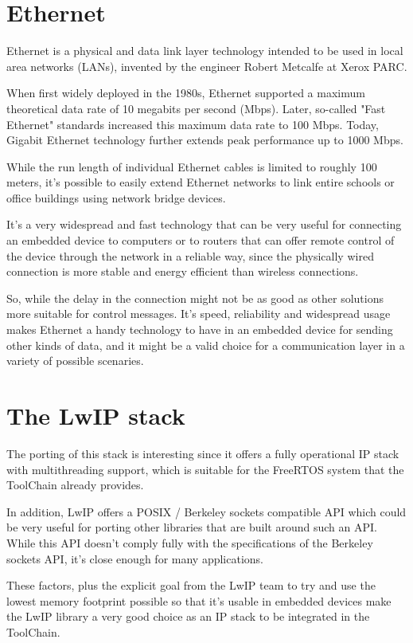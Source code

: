 \section {Ethernet}

Ethernet is a physical and data link layer technology intended to be used in local area networks (LANs), invented by the engineer Robert Metcalfe at Xerox PARC.

When first widely deployed in the 1980s, Ethernet supported a maximum theoretical data rate of 10 megabits per second (Mbps). Later, so-called "Fast Ethernet" standards increased this maximum data rate to 100 Mbps. Today, Gigabit Ethernet technology further extends peak performance up to 1000 Mbps.

While the run length of individual Ethernet cables is limited to roughly 100 meters, it's possible to easily extend Ethernet networks to link entire schools or office buildings using network bridge devices.

It's a very widespread and fast technology that can be very useful for connecting an embedded device to computers or to routers that can offer remote control of the device through the network in a reliable way, since the physically wired connection is more stable and energy efficient than wireless connections.

So, while the delay in the connection might not be as good as other solutions more suitable for control messages. It's speed, reliability and widespread usage makes Ethernet a handy technology to have in an embedded device for sending other kinds of data, and it might be a valid choice for a communication layer in a variety of possible scenaries.

\section{The LwIP stack}


The porting of this stack is interesting since it offers a fully operational IP stack with multithreading support, which is suitable for the FreeRTOS system that the ToolChain already provides.

In addition, LwIP offers a POSIX / Berkeley sockets compatible API which could be very useful for porting other libraries that are built around such an API. While this API doesn't comply fully with the specifications of the Berkeley sockets API, it's close enough for many applications.

These factors, plus the explicit goal from the LwIP team to try and use the lowest memory footprint possible so that it's usable in embedded devices make the LwIP library a very good choice as an IP stack to be integrated in the ToolChain.


